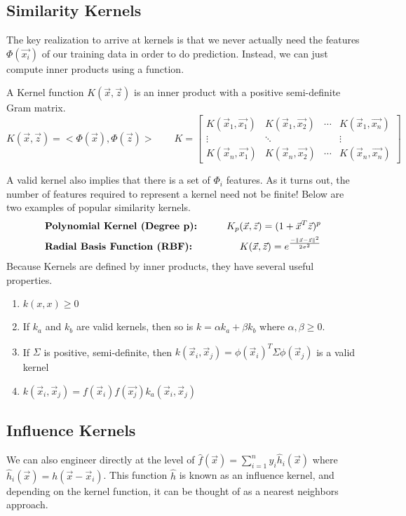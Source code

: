 \subsection{Similarity Kernels}
The key realization to arrive at kernels is that we never actually need the features $\Phi(\vec{x_i})$ of our training data in order to do prediction. Instead, we can just compute inner products using a function.
\begin{definition}
  A Kernel function $K(\vec{x}, \vec{z})$ is an inner product with a positive semi-definite Gram matrix.
  \[
    K(\vec{x}, \vec{z}) = <\Phi(\vec{x}), \Phi(\vec{z})> \qquad K = \begin{bmatrix}
      K(\vec{x}_1, \vec{x_1}) &  K(\vec{x}_1, \vec{x_2}) &  \cdots & K(\vec{x}_1, \vec{x_n})\\
      \vdots & \ddots & & \vdots\\
      K(\vec{x}_n, \vec{x_1}) &  K(\vec{x}_n, \vec{x_2}) &  \cdots & K(\vec{x}_n, \vec{x_n})
    \end{bmatrix}
  \]

\end{definition}
A valid kernel also implies that there is a set of $\Phi_i$ features. As it turns out, the number of features required to represent a kernel need not be finite! Below are two examples of popular similarity kernels.
\begin{align*}
  &\textbf{Polynomial Kernel (Degree p):} &\qquad K_p(\vec{x},\vec{z}) = (1+\vec{x}^T\vec{z})^p\\
  &\textbf{Radial Basis Function (RBF):} &\qquad K(\vec{x}, \vec{z}) = e^{\frac{-\|\vec{x}-\vec{z}\|^2}{2\sigma^2}}
\end{align*}
Because Kernels are defined by inner products, they have several useful properties.
\begin{enumerate}
  \item $k(x, x) \geq 0$
  \item If $k_a$ and $k_b$ are valid kernels, then so is $k = \alpha k_a + \beta k_b$ where $\alpha, \beta \geq 0$.
  \item If $\Sigma$ is positive, semi-definite, then $k(\vec{x}_i, \vec{x}_j)=\phi(\vec{x}_i)^T\Sigma\phi(\vec{x}_j)$ is a valid kernel
  \item $k(\vec{x}_i, \vec{x}_j) = f(\vec{x}_i)f(\vec{x_j})k_a(\vec{x}_i, \vec{x}_j)$
\end{enumerate}
\subsection{Influence Kernels}
We can also engineer directly at the level of $\hat{f}(\vec{x})=\sum_{i=1}^ny_i\hat{h}_i(\vec{x})$ where $\hat{h}_i(\vec{x})=h(\vec{x}-\vec{x}_i)$.
This function $\hat{h}$ is known as an influence kernel, and depending on the kernel function, it can be thought of as a nearest neighbors approach.
